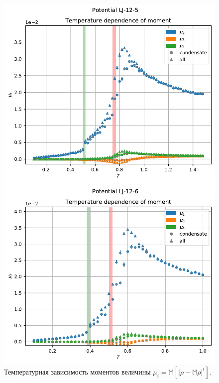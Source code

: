 \documentclass[pdf,hyperref={unicode}]{beamer}
\begin{document}
\begin{frame}
\begin{figure}[h]
\begin{center}
\begin{minipage}[h]{0.35\linewidth}
\includegraphics[width=\textwidth, keepaspectratio]{plot_moment_Potential LJ-12-5_1}
\end{minipage}
\begin{minipage}[h]{0.35\linewidth}
\includegraphics[width=\textwidth, keepaspectratio]{plot_moment_Potential LJ-12-6_1}
\end{minipage}
\caption{\tiny Температурная зависимость моментов величины $\mu_i = \mathbb{M} \left[ |\rho - \mathbb{M} \rho|^i \right]$.}
\label{risMu}
\end{center}
\end{figure}

\end{frame}
\end{document}
